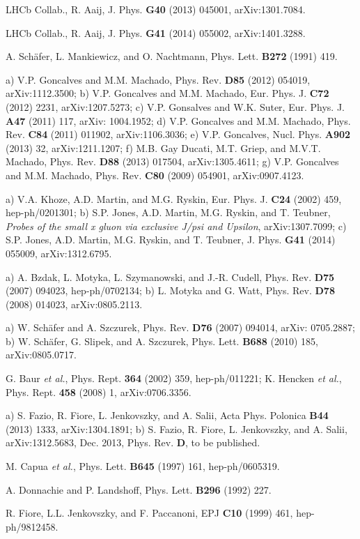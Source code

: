 \documentclass[12pt]{article}
\begin{document}
\begin{thebibliography}{99}
 LHCb Collab., R. Aaij, J. Phys. {\bf G40} (2013) 045001, arXiv:1301.7084.

  LHCb Collab., R. Aaij, J. Phys. {\bf G41} (2014) 055002, arXiv:1401.3288.

 A. Sch\"afer, L. Mankiewicz, and O. Nachtmann, Phys. Lett. {\bf B272} (1991) 419.

 a) V.P. Goncalves and M.M. Machado, Phys. Rev. {\bf D85} (2012) 054019, arXiv:1112.3500;
b) V.P. Goncalves and M.M. Machado, Eur. Phys. J. {\bf C72} (2012) 2231, arXiv:1207.5273; c) V.P. Gonsalves and W.K. Suter, Eur. Phys. J. {\bf A47} (2011) 117,
arXiv: 1004.1952;
d) V.P. Goncalves and M.M. Machado, Phys. Rev. {\bf C84} (2011) 011902, arXiv:1106.3036; e) V.P. Goncalves, Nucl. Phys. {\bf A902} (2013) 32,  
arXiv:1211.1207; f) M.B. Gay Ducati, M.T. Griep, and M.V.T. Machado, Phys. Rev. {\bf D88} (2013) 017504, arXiv:1305.4611;
g) V.P. Goncalves and M.M. Machado, Phys. Rev. {\bf C80} (2009) 054901, arXiv:0907.4123.

 a) V.A. Khoze, A.D. Martin, and M.G. Ryskin, Eur. Phys. J. {\bf C24} (2002) 459, hep-ph/0201301;
b) S.P. Jones, A.D. Martin, M.G. Ryskin, and T. Teubner, {\it Probes of the small x gluon via exclusive J/psi and Upsilon}, arXiv:1307.7099;
c) S.P. Jones, A.D. Martin, M.G. Ryskin, and T. Teubner,  J. Phys. {\bf G41} (2014) 055009, arXiv:1312.6795.

 a) A. Bzdak,  L. Motyka, L. Szymanowski, and J.-R. Cudell, Phys. Rev. {\bf D75} (2007) 094023, hep-ph/0702134; 
b) L. Motyka and G. Watt, Phys. Rev. {\bf D78} (2008) 014023, arXiv:0805.2113.

 a) W. Sch\"afer and A. Szczurek, Phys. Rev. {\bf D76} (2007) 094014, arXiv: 0705.2887; b) W. Sch\"afer, G. Slipek, and A. Szczurek,
Phys. Lett. {\bf B688} (2010) 185, arXiv:0805.0717.


 G. Baur {\it et al.}, Phys. Rept. {\bf 364} (2002) 359, hep-ph/011221; K. Hencken {\it et al.}, Phys. Rept. {\bf 458} (2008) 1, arXiv:0706.3356.

 a) S. Fazio, R. Fiore, L. Jenkovszky, and A. Salii, Acta Phys. Polonica {\bf B44} (2013) 1333, arXiv:1304.1891; b) S. Fazio, R. Fiore, L. Jenkovszky, and A. Salii, 
arXiv:1312.5683, Dec. 2013, Phys. Rev. {\bf D}, to be published. 

 M. Capua {\it et al.}, Phys. Lett. {\bf B645} (1997) 161, hep-ph/0605319.



 A. Donnachie and P. Landshoff, Phys. Lett. {\bf B296} (1992) 227.

 R. Fiore, L.L. Jenkovszky, and F. Paccanoni, EPJ {\bf C10} (1999) 461, hep-ph/9812458.




\end{thebibliography}
\end{document}
